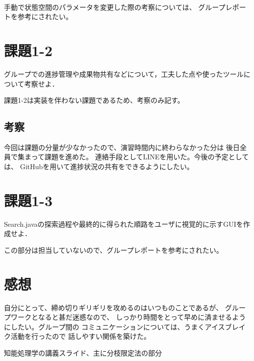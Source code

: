 \documentclass{jarticle}
\begin{document}
\paragraph{}
手動で状態空間のパラメータを変更した際の考察については、
グループレポートを参考にされたい。

\section{課題1-2}
\begin{screen}
  グループでの進捗管理や成果物共有などについて，工夫した点や使ったツールについて考察せよ．
\end{screen}

課題1-2は実装を伴わない課題であるため、考察のみ記す。

\subsection{考察}
  今回は課題の分量が少なかったので、演習時間内に終わらなかった分は
  後日全員で集まって課題を進めた。
  連絡手段としてLINEを用いた。今後の予定としては、
  GitHubを用いて進捗状況の共有をできるようにしたい。

\section{課題1-3}
\begin{screen}
  Search.javaの探索過程や最終的に得られた順路をユーザに視覚的に示すGUIを作成せよ．
\end{screen}
この部分は担当していないので、グループレポートを参考にされたい。

\section{感想}
自分にとって、締め切りギリギリを攻めるのはいつものことであるが、
グループワークとなると甚だ迷惑なので、
しっかり時間をとって早めに済ませるようにしたい。グループ間の
コミュニケーションについては、うまくアイスブレイク活動を行ったので
話しやすい関係を築けた。

\begin{thebibliography}{99}
 知能処理学の講義スライド、主に分枝限定法の部分
\end{thebibliography}
\end{document}
